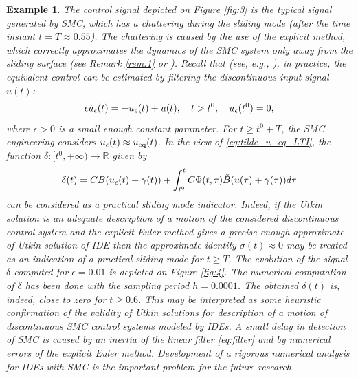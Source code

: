 \documentclass{article}
\newcommand{\R}{\mathbb{R}}
\newtheorem{example}{Example}
\begin{document}
\begin{example}
	The control signal depicted on Figure \ref{fig:3} is the typical signal generated by SMC, which has a chattering during  the sliding mode (after the time instant $t=T\approx 0.55$). The chattering is caused by the use of the  explicit method, which correctly approximates the dynamics of the SMC system only away from the sliding surface (see Remark \ref{rem:1} or \cite{AcaryBrogliato2010:SCL}).
	Recall that (see, e.g., \cite{Utkin1992:Book}), in practice, the equivalent control can be estimated by filtering the discontinuous input signal $u(t)$:\vspace{-1mm}
	\begin{equation}\label{eq:filter}
		\epsilon\dot u_{\epsilon}(t)=-u_{\epsilon}(t)+u(t), \quad t>t^0, \quad u_{\epsilon}(t^0)=0, \vspace{-1mm}
	\end{equation} 
	where $\epsilon>0$ is a small enough constant parameter.  For $t\geq t^0+T$, the SMC engineering   considers
	$u_{\epsilon}(t)\approx u_{\rm eq}(t)$.
	In the view of \eqref{eq:tilde_u_eq_LTI}, the function $\delta: [t^0, +\infty)\to \R$ given by\vspace{-1mm}
	\begin{equation*}
		\delta(t)=CB(u_{\epsilon}(t)+\gamma(t))+\int^t_{t^0}C\Phi(t,\tau) \tilde B(u(\tau)+\gamma(\tau)) d\tau\vspace{-1mm}
	\end{equation*}
	can be considered as a practical sliding mode indicator. 
		Indeed,  if   the Utkin solution  is an adequate description of a motion of  the considered discontinuous control system  and 
		the explicit Euler method gives a precise enough approximate of Utkin solution of IDE then the approximate identity  $\sigma(t)\approx 0$   may  be treated  as an indication  of a practical sliding mode for $t\geq T$. The evolution of the signal $\delta$ computed for $\epsilon=0.01$ is depicted on Figure \ref{fig:4}. The numerical computation of $\delta$ has been done with the sampling period $h=0.0001$. The obtained $\delta(t)$ is, indeed, close to zero for $t\geq 0.6$. This may be interpreted as some heuristic confirmation of the validity  of Utkin solutions for description of a motion of discontinuous SMC control systems modeled by IDEs.     A small delay in detection of SMC is  caused by an inertia  of the linear filter \eqref{eq:filter} and by  numerical errors of the explicit Euler method. Development of a rigorous numerical analysis for IDEs with SMC is the important problem for the future research. 
			\begin{figure}

\end{figure}
\end{example}
\end{document}
